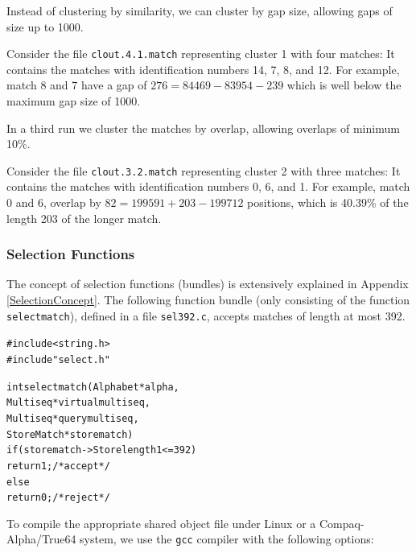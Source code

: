 \documentclass[12pt,titlepage]{article}
\makeatletter
\newcommand{\Selectionfunction}[1]{\texttt{\small #1}\index{#1@\texttt{#1}}}
\newcommand{\EXECUTE}[1]{}
\newenvironment{LargeOutput}{%
 \begin{footnotesize}
 \begin{alltt}}{%
 \end{alltt}
 \end{footnotesize}%
 \addvspace{-\medskipamount}
}
\makeatother
\begin{document}
\begin{AboutVmatch}
Instead of clustering by similarity, we can cluster 
by gap size, allowing gaps of size up to 1000.

\EXECUTE{vmatch -l 100 -pp matchcluster gapsize 1000 outprefix clout ychrIII.fna}

Consider the file \texttt{clout.4.1.match} representing cluster 1
with four matches: It contains the matches with identification
numbers 14, 7, 8, and 12. For example, match 8 and 7 have a gap of
\(276=84469 - 83954 - 239\) which is well below the maximum gap size
of 1000.

\EXECUTE{cat clout.4.1.match}

In a third run we cluster the matches by overlap, allowing overlaps
of minimum 10\%.

\EXECUTE{vmatch -l 100 -pp matchcluster overlap 10 outprefix clout ychrIII.fna}

Consider the file \texttt{clout.3.2.match} representing cluster 2
with three matches: It contains the matches with identification
numbers 0, 6, and 1. For example, match 0 and 6, overlap by
\(82=199591 + 203 - 199712\) positions, which is 40.39\% of the length 203
of the longer match.

\EXECUTE{cat clout.3.2.match}

\subsubsection{Selection Functions}\label{SelectionExample}
The concept of selection functions (bundles) is extensively explained
in Appendix \ref{SelectionConcept}. The following function bundle (only
consisting of the function \Selectionfunction{selectmatch}), 
defined in a file \texttt{sel392.c}, accepts matches of length at most 392.

\begin{LargeOutput}
#include <string.h>
#include "select.h"

int selectmatch(Alphabet *alpha,
                Multiseq *virtualmultiseq,
                Multiseq *querymultiseq,
                StoreMatch *storematch)
  if(storematch->Storelength1 <= 392)
    return 1;  /* accept */
   else
    return 0;  /* reject */
\end{LargeOutput}

To compile the appropriate shared object file under 
 Linux or a  Compaq-Alpha/True64 
system, we use the \texttt{gcc} compiler with the following options:


\end{AboutVmatch}
\end{document}
